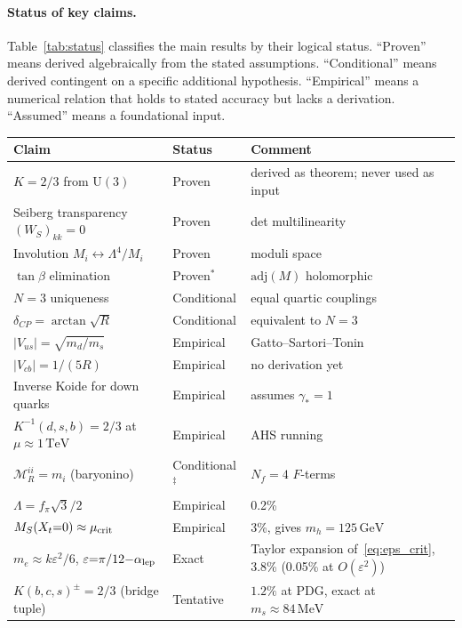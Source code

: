 \documentclass[12pt,a4paper]{article}
\newcommand{\UU}{\mathrm{U}}
\newcommand{\Nf}{N_f}
\newcommand{\adj}{\mathrm{adj}}
\newcommand{\MeV}{\,\mathrm{MeV}}
\newcommand{\GeV}{\,\mathrm{GeV}}
\newcommand{\TeV}{\,\mathrm{TeV}}
\begin{document}
\paragraph{Status of key claims.}
Table~\ref{tab:status} classifies the main results by their
logical status. ``Proven'' means derived algebraically from the
stated assumptions. ``Conditional'' means derived contingent on
a specific additional hypothesis. ``Empirical'' means a numerical
relation that holds to stated accuracy but lacks a derivation.
``Assumed'' means a foundational input.

\begin{table}[ht]
\centering\small
\begin{tabular}{lll}
\hline
Claim & Status & Comment \\
\hline
$K = 2/3$ from $\UU(3)$ & Proven & derived as theorem; never used as input \\
Seiberg transparency $(W_S)_{kk} = 0$ & Proven & det multilinearity \\
Involution $M_i \leftrightarrow \Lambda^4/M_i$ & Proven & moduli space \\
$\tan\beta$ elimination & Proven${}^*$ & $\adj(M)$ holomorphic \\
$N = 3$ uniqueness & Conditional & equal quartic couplings \\
$\delta_{CP} = \arctan\!\sqrt{R}$ & Conditional & equivalent to $N{=}3$ \\
$|V_{us}| = \sqrt{m_d/m_s}$ & Empirical & Gatto--Sartori--Tonin~\cite{GattoSartoriTonin:1968} \\
$|V_{cb}| = 1/(5R)$ & Empirical & no derivation yet \\
Inverse Koide for down quarks & Empirical & assumes $\gamma_* = 1$ \\
$K^{-1}(d,s,b) = 2/3$ at $\mu\!\approx\!1\TeV$ & Empirical & AHS running~\cite{AntuschHinzeSaad:2025} \\
$\mathcal{M}_R^{ii} = m_i$ (baryonino) & Conditional${}^\ddagger$ & $\Nf{=}4$ $F$-terms \\
$\Lambda = f_\pi\sqrt{3}/2$ & Empirical & 0.2\% \\
$M_S(X_t{=}0) \approx \mu_{\rm crit}$ & Empirical & 3\%, gives $m_h{=}125\GeV$ \\
$m_e \approx k\varepsilon^2/6$, $\varepsilon{=}\pi/12{-}\alpha_{\rm lep}$ & Exact & Taylor expansion of~\eqref{eq:eps_crit}, 3.8\% (0.05\% at $O(\varepsilon^2)$) \\
$K(b,c,s)^{\pm} = 2/3$ (bridge tuple) & Tentative & $1.2\%$ at PDG, exact at $m_s \approx 84\MeV$ \\

\end{tabular}
\end{table}
\end{document}
